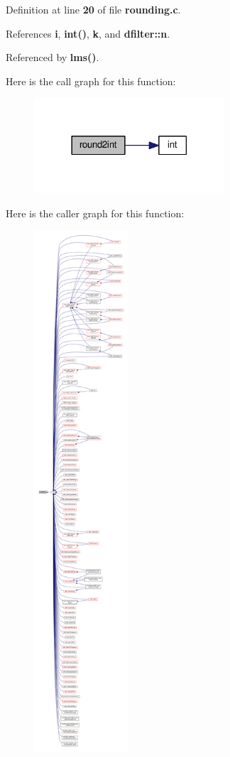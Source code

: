 Definition at line {\bf 20} of file {\bf rounding.\+c}.



References {\bf i}, {\bf int()}, {\bf k}, and {\bf dfilter\+::n}.



Referenced by {\bf lms()}.



Here is the call graph for this function\+:
\nopagebreak
\begin{figure}[H]
\begin{center}
\leavevmode
\includegraphics[width=201pt]{d8/d91/rounding_8c_aca2670cc0fbf948a6b9cb670047c9d5b_cgraph}
\end{center}
\end{figure}




Here is the caller graph for this function\+:
\nopagebreak
\begin{figure}[H]
\begin{center}
\leavevmode
\includegraphics[height=550pt]{d8/d91/rounding_8c_aca2670cc0fbf948a6b9cb670047c9d5b_icgraph}
\end{center}
\end{figure}


